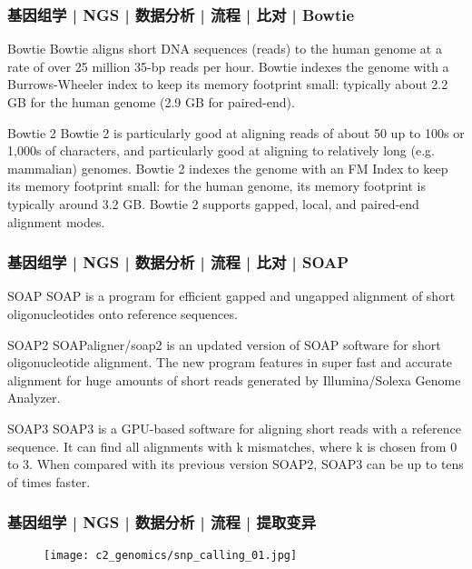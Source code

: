 \begin{frame}
  \frametitle{基因组学 | NGS | 数据分析 | 流程 | 比对 | Bowtie}
  \begin{block}{Bowtie}
 Bowtie aligns short DNA sequences (reads) to the human genome at a rate of over 25 million 35-bp reads per hour. Bowtie indexes the genome with a Burrows-Wheeler index to keep its memory footprint small: typically about 2.2 GB for the human genome (2.9 GB for paired-end).
  \end{block}
  \pause
  \begin{block}{Bowtie 2}
    Bowtie 2 is particularly good at aligning reads of about 50 up to 100s or 1,000s of characters, and particularly good at aligning to relatively long (e.g. mammalian) genomes. Bowtie 2 indexes the genome with an FM Index to keep its memory footprint small: for the human genome, its memory footprint is typically around 3.2 GB. Bowtie 2 supports gapped, local, and paired-end alignment modes.
  \end{block}
\end{frame}

\begin{frame}
  \frametitle{基因组学 | NGS | 数据分析 | 流程 | 比对 | SOAP}
  \begin{block}{SOAP}
    SOAP is a program for efficient gapped and ungapped alignment of short oligonucleotides onto reference sequences.
  \end{block}
  \pause
  \begin{block}{SOAP2}
    SOAPaligner/soap2 is an updated version of SOAP software for short oligonucleotide alignment. The new program features in super fast and accurate alignment for huge amounts of short reads generated by Illumina/Solexa Genome Analyzer.
  \end{block}
  \pause
  \begin{block}{SOAP3}
    SOAP3 is a GPU-based software for aligning short reads with a reference sequence. It can find all alignments with k mismatches, where k is chosen from 0 to 3. When compared with its previous version SOAP2, SOAP3 can be up to tens of times faster.
  \end{block}
\end{frame}

\begin{frame}
  \frametitle{基因组学 | NGS | 数据分析 | 流程 | 提取变异}
  \begin{figure}
    \centering
    \texttt{[image: c2\_genomics/snp\_calling\_01.jpg]}
  \end{figure}
\end{frame}

